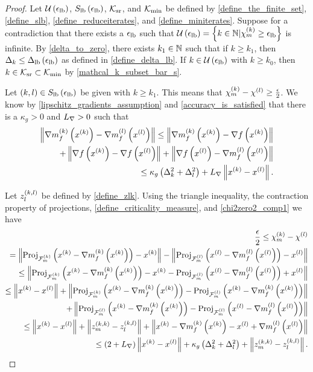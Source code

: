 \begin{proof}
Let $\ulb$, $\slb$, $\reduceiterates$, and $\miniterates$ be defined by 
\cref{define_the_finite_set}, \cref{define_slb}, \cref{define_reduceiterates}, and \cref{define_miniterates}.
Suppose for a contradiction that there exists a $\elb$ such that $\ulb = \left\{k \in \naturals | \chik \ge \elb \right\}$ is infinite.
By \cref{delta_to_zero}, there exists $k_1 \in \naturals$ such that if $k \ge k_1$, then $\dk \le \dlb$ as defined in \cref{define_delta_lb}.
If $k \in \ulb$ with $k \ge k_0$, then $k \in \reduceiterates \subset \miniterates$ by \cref{mathcal_k_subset_bar_s}.

Let $(k, l) \in \slb$ be given with $k \ge k_1$.
This means that $\chik - \chi^{(l)} \ge \frac {\epsilon} 2 $.
We know by \cref{lipschitz_gradients_assumption} and \cref{accuracy_is_satisfied} that there is a $\kappa_g > 0$ and $\lipgrad>0$ such that
\begin{align}
\left\|\gk - \gl\right\| \nonumber 
\le \left\|\gk - \gradf\left(\xk\right)\right\| \\
+ \left\|\gradf\left(\xk\right) - \gradf\left(\xl\right)\right\| 
+ \left\|\gradf\left(\xl\right) - \gl \right\| \nonumber \\
\le \kappa_g \left(\dk^2 + \dl^2\right) + \lipgrad \left\|\xk - \xl \right\|. \label{chi2zero2_comp1}
\end{align}


Let $\zlk$ be defined by \cref{define_zlk}.
Using the triangle inequality, the contraction property of projections, 
\cref{define_criticality_measure}, and \cref{chi2zero2_comp1} we have 
\begin{align*}
\frac{\epsilon}{2} \le \chik - \chi^{(l)} \\
=     \left\|\proj_{\feasiblek}\left(\xk - \gk\right) - \xk\right \| 
    - \left\|\proj_{\feasiblel}\left(\xl - \gl\right) - \xl\right \| \\
\le   \left\|\proj_{\feasiblek}\left(\xk - \gk\right) - \xk
    -  \proj_{\feasiblel}\left(\xl - \gl\right) + \xl\right \| \\
 \le  \left\|\xk - \xl\right\|
 + \left\|\proj_{\feasiblek}\left(\xk - \gk\right) -  \proj_{\feasiblel}\left(\xk - \gk\right) \right\| \\
 + \left\|\proj_{\feasiblel}\left(\xk - \gk\right) -  \proj_{\feasiblel}\left(\xl - \gl\right) \right\| \\
\le \left\|\xk - \xl\right\| + \left\|\zmk - \zlk\right\| 
+ \left\| \xk - \gk - \xl + \gl  \right\| \\
\le \left(2 + \lipgrad\right) \left\|\xk - \xl\right\| 
+ \kappa_g \left(\dk^2 + \dl^2\right)
+ \left\|\zmk - \zlk\right\|.
\end{align*}
        

\end{proof}
